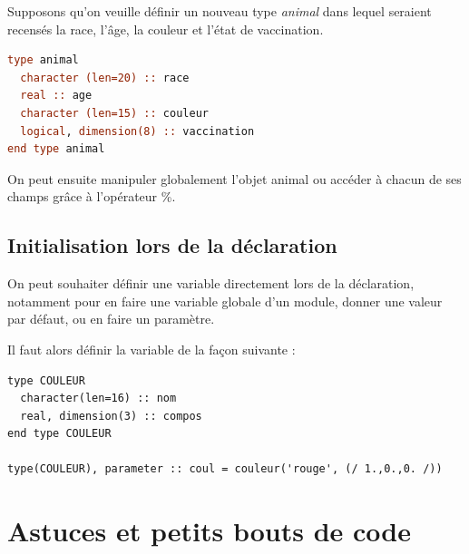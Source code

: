 \documentclass[a4paper,twoside]{article}
\begin{document}
\bigskip

\begin{exemple}
Supposons qu'on veuille définir un nouveau type \textit{animal} dans lequel seraient recensés la race, l'âge, la couleur et l'état de vaccination.
\begin{lstlisting}[language=Fortran]
type animal
  character (len=20) :: race
  real :: age
  character (len=15) :: couleur
  logical, dimension(8) :: vaccination
end type animal
\end{lstlisting}

On peut ensuite manipuler globalement l'objet animal ou accéder à chacun de ses champs grâce à l'opérateur \og \%\fg.

\end{exemple}

\subsection{Initialisation lors de la déclaration}
On peut souhaiter définir une variable directement lors de la déclaration, notamment pour en faire une variable globale d'un module, donner une valeur par défaut, ou en faire un paramètre. 

Il faut alors définir la variable de la façon suivante :
\begin{verbatim}
type COULEUR
  character(len=16) :: nom
  real, dimension(3) :: compos
end type COULEUR

type(COULEUR), parameter :: coul = couleur('rouge', (/ 1.,0.,0. /))
\end{verbatim}


\section{Astuces et petits bouts de code}
\end{document}
